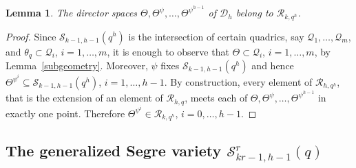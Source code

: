 \documentclass[11pt]{article}
\newtheorem{lemma}[theorem]{Lemma}
\theoremstyle{definition}
\numberwithin{equation}{section}
\def\cQ{\mathcal Q}
\def\cD{\mathcal D}
\def\cR{\mathcal R}
\def\cS{\mathcal S}
\begin{document}
\begin{lemma}\label{contained}
The director spaces $\Theta, \Theta^{\psi}, \dots, \Theta^{\psi^{h-1}}$ of $\cD_h$ belong to $\mathcal R_{k,q^h}$.
\end{lemma}
\begin{proof}
Since $\cS_{k-1, h-1}(q^h)$ is the intersection of certain quadrics, say  $\cQ_1, \dots, \cQ_{m}$, and $\theta_q \subset \cQ_i$, $i = 1, \dots, m$, it is enough to observe that $\Theta \subset \cQ_i$, $i = 1, \dots, m$, by Lemma~\ref{subgeometry}. Moreover, $\psi$ fixes $\cS_{k-1, h-1}(q^h)$ and hence $\Theta^{\psi^i} \subseteq \mathcal S_{k-1,h-1}(q^h)$, $i = 1, \dots, h-1$. By construction, every element of $\mathcal R_{h,q^h}$, that is the extension of
an element of $\mathcal R_{h,q}$, meets each of
$\Theta, \Theta^{\psi}, \dots, \Theta^{\psi^{h-1}}$ in exactly one point. Therefore $\Theta^{\psi^i} \in \cR_{k, q^h}$, $i = 0, \dots, h-1$.
\end{proof}




\subsection{The generalized Segre variety $\cS^r_{kr-1,h-1}(q)$}\label{sec:generalized-segre}
\end{document}
